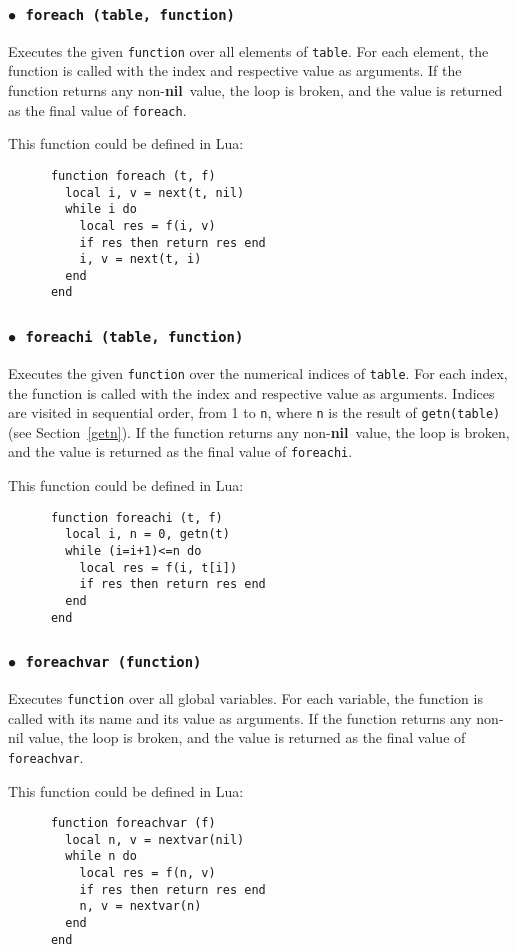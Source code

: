 \documentclass[11pt]{article}
\newcommand{\See}[1]{Section~\ref{#1}}
\newcommand{\see}[1]{(see \See{#1})}
\newcommand{\T}[1]{{\tt #1}}
\newcommand{\nil}{{\bf nil}}
\newcommand{\Deffunc}[1]{\index{#1}}
\newcommand{\ff}{$\bullet$\ }
\begin{document}
\subsubsection*{\ff \T{foreach (table, function)}}\Deffunc{foreach}
Executes the given \verb|function| over all elements of \verb|table|.
For each element, the function is called with the index and
respective value as arguments.
If the function returns any non-\nil\ value,
the loop is broken, and the value is returned
as the final value of \verb|foreach|.

This function could be defined in Lua:
\begin{verbatim}
      function foreach (t, f)
        local i, v = next(t, nil)
        while i do
          local res = f(i, v)
          if res then return res end
          i, v = next(t, i)
        end
      end
\end{verbatim}


\subsubsection*{\ff \T{foreachi (table, function)}}\Deffunc{foreachi}
Executes the given \verb|function| over the
numerical indices of \verb|table|.
For each index, the function is called with the index and
respective value as arguments.
Indices are visited in sequential order,
from 1 to \verb|n|,
where \verb|n| is the result of \verb|getn(table)| \see{getn}.
If the function returns any non-\nil\ value,
the loop is broken, and the value is returned
as the final value of \verb|foreachi|.

This function could be defined in Lua:
\begin{verbatim}
      function foreachi (t, f)
        local i, n = 0, getn(t)
        while (i=i+1)<=n do
          local res = f(i, t[i])
          if res then return res end
        end
      end
\end{verbatim}

\subsubsection*{\ff \T{foreachvar (function)}}\Deffunc{foreachvar}
Executes \verb|function| over all global variables.
For each variable,
the function is called with its name and its value as arguments.
If the function returns any non-nil value,
the loop is broken, and the value is returned
as the final value of \verb|foreachvar|.

This function could be defined in Lua:
\begin{verbatim}
      function foreachvar (f)
        local n, v = nextvar(nil)
        while n do
          local res = f(n, v)
          if res then return res end
          n, v = nextvar(n)
        end
      end
\end{verbatim}
\end{document}

